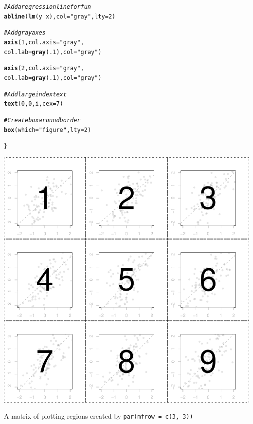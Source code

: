 \documentclass{tufte-book}\usepackage[]{graphicx}\usepackage[]{color}
\makeatletter
\def\maxwidth{ %
  \ifdim\Gin@nat@width>\linewidth
    \linewidth
  \else
    \Gin@nat@width
  \fi
}
\newcommand{\hlnum}[1]{\textcolor[rgb]{0.686,0.059,0.569}{#1}}%
\newcommand{\hlstr}[1]{\textcolor[rgb]{0.192,0.494,0.8}{#1}}%
\newcommand{\hlcom}[1]{\textcolor[rgb]{0.678,0.584,0.686}{\textit{#1}}}%
\newcommand{\hlopt}[1]{\textcolor[rgb]{0,0,0}{#1}}%
\newcommand{\hlstd}[1]{\textcolor[rgb]{0.345,0.345,0.345}{#1}}%
\newcommand{\hlkwc}[1]{\textcolor[rgb]{0.333,0.667,0.333}{#1}}%
\newcommand{\hlkwd}[1]{\textcolor[rgb]{0.737,0.353,0.396}{\textbf{#1}}}%
\newenvironment{kframe}{%
 \def\at@end@of@kframe{}%
 \ifinner\ifhmode%
  \def\at@end@of@kframe{\end{minipage}}%
  \begin{minipage}{\columnwidth}%
 \fi\fi%
 \def\FrameCommand##1{\hskip\@totalleftmargin \hskip-\fboxsep
 \colorbox{shadecolor}{##1}\hskip-\fboxsep
     \hskip-\linewidth \hskip-\@totalleftmargin \hskip\columnwidth}%
 \MakeFramed {\advance\hsize-\width
   \@totalleftmargin\z@ \linewidth\hsize
   \@setminipage}}%
 {\par\unskip\endMakeFramed%
 \at@end@of@kframe}
\newenvironment{knitrout}{}{} %
\makeatother
\begin{document}
\begin{footnotesize}
\begin{marginfigure}
\begin{tiny}
\begin{knitrout}
\begin{kframe}
\begin{alltt}
\hlcom{# Add a regression line for fun}
\hlkwd{abline}\hlstd{(}\hlkwd{lm}\hlstd{(y} \hlopt{~} \hlstd{x),} \hlkwc{col} \hlstd{=} \hlstr{"gray"}\hlstd{,} \hlkwc{lty} \hlstd{=} \hlnum{2}\hlstd{)}


\hlcom{# Add gray axes}
\hlkwd{axis}\hlstd{(}\hlnum{1}\hlstd{,} \hlkwc{col.axis} \hlstd{=} \hlstr{"gray"}\hlstd{,}
     \hlkwc{col.lab} \hlstd{=} \hlkwd{gray}\hlstd{(}\hlnum{.1}\hlstd{),} \hlkwc{col} \hlstd{=} \hlstr{"gray"}\hlstd{)}

\hlkwd{axis}\hlstd{(}\hlnum{2}\hlstd{,} \hlkwc{col.axis} \hlstd{=} \hlstr{"gray"}\hlstd{,}
     \hlkwc{col.lab} \hlstd{=} \hlkwd{gray}\hlstd{(}\hlnum{.1}\hlstd{),} \hlkwc{col} \hlstd{=} \hlstr{"gray"}\hlstd{)}

\hlcom{# Add large index text}
\hlkwd{text}\hlstd{(}\hlnum{0}\hlstd{,} \hlnum{0}\hlstd{, i,} \hlkwc{cex} \hlstd{=} \hlnum{7}\hlstd{)}

\hlcom{# Create box around border}
\hlkwd{box}\hlstd{(}\hlkwc{which} \hlstd{=} \hlstr{"figure"}\hlstd{,} \hlkwc{lty} \hlstd{=} \hlnum{2}\hlstd{)}

\hlstd{\}}
\end{alltt}
\end{kframe}
\includegraphics[width=\maxwidth]{figure/unnamed-chunk-181-1} 

\end{knitrout}
\end{tiny}
\caption{A matrix of plotting regions created by \texttt{par(mfrow = c(3, 3))}}
\label{fig:mfrow}
\end{marginfigure}



\end{footnotesize}
\end{document}
